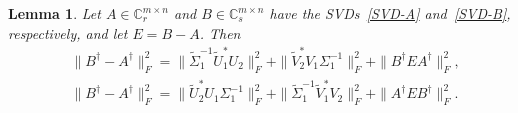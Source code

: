 \documentclass[11pt]{article}
\newtheorem{lemma}{Lemma}[section]
\begin{document}
\begin{lemma}\label{identity}
Let $A\in\mathbb{C}^{m\times n}_{r}$ and $B\in\mathbb{C}^{m\times n}_{s}$ have the SVDs~\eqref{SVD-A} and~\eqref{SVD-B}, respectively, and let $E=B-A$. Then
\begin{subequations}
\begin{align}
&\|B^{\dagger}-A^{\dagger}\|_{F}^{2}=\|\widetilde{\Sigma}_{1}^{-1}\widetilde{U}_{1}^{\ast}U_{2}\|_{F}^{2}+\|\widetilde{V}_{2}^{\ast}V_{1}\Sigma_{1}^{-1}\|_{F}^{2}+\|B^{\dagger}EA^{\dagger}\|_{F}^{2},\label{ide1.1}\\
&\|B^{\dagger}-A^{\dagger}\|_{F}^{2}=\|\widetilde{U}_{2}^{\ast}U_{1}\Sigma_{1}^{-1}\|_{F}^{2}+\|\widetilde{\Sigma}_{1}^{-1}\widetilde{V}_{1}^{\ast}V_{2}\|_{F}^{2}+\|A^{\dagger}EB^{\dagger}\|_{F}^{2}.\label{ide1.2}
\end{align}
\end{subequations}
\end{lemma}
\end{document}
